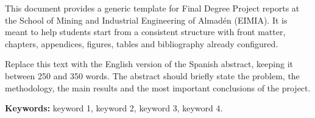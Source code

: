This document provides a generic template for Final Degree Project reports at
the School of Mining and Industrial Engineering of Almadén (EIMIA). It is meant
to help students start from a consistent structure with front matter, chapters,
appendices, figures, tables and bibliography already configured.

Replace this text with the English version of the Spanish abstract, keeping it
between 250 and 350 words. The abstract should briefly state the problem, the
methodology, the main results and the most important conclusions of the project.

\textbf{Keywords:}
keyword 1,
keyword 2,
keyword 3,
keyword 4.

\cleardoublepage

\ifspanish
\else
\fi
\setindexnames
